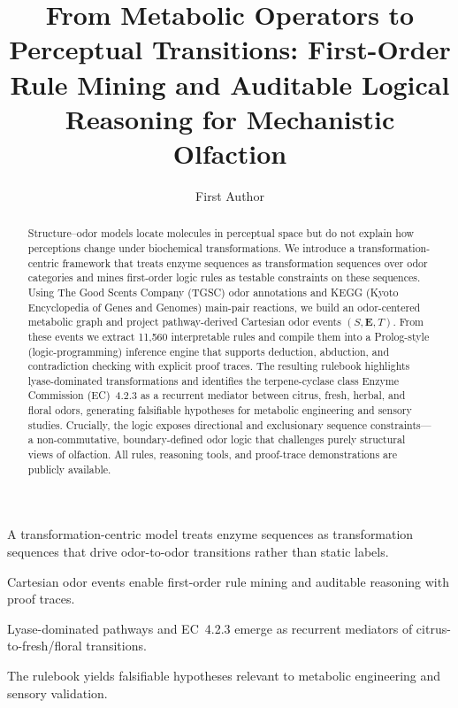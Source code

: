 \documentclass[a4paper,fleqn]{cas-sc}
\begin{document}
\let\WriteBookmarks\relax



\title[mode=title]{From Metabolic Operators to Perceptual Transitions: First-Order Rule Mining and Auditable Logical Reasoning for Mechanistic Olfaction}

\author[1]{First Author}
\cormark[1]



\begin{abstract}
Structure--odor models locate molecules in perceptual space but do not explain how perceptions change under biochemical transformations. We introduce a transformation-centric framework that treats enzyme sequences as transformation sequences over odor categories and mines first-order logic rules as testable constraints on these sequences. Using The Good Scents Company (TGSC) odor annotations and KEGG (Kyoto Encyclopedia of Genes and Genomes) main-pair reactions, we build an odor-centered metabolic graph and project pathway-derived Cartesian odor events $(S, \mathbf{E}, T)$. From these events we extract 11,560 interpretable rules and compile them into a Prolog-style (logic-programming) inference engine that supports deduction, abduction, and contradiction checking with explicit proof traces. The resulting rulebook highlights lyase-dominated transformations and identifies the terpene-cyclase class Enzyme Commission (EC)~4.2.3 as a recurrent mediator between citrus, fresh, herbal, and floral odors, generating falsifiable hypotheses for metabolic engineering and sensory studies. Crucially, the logic exposes directional and exclusionary sequence constraints---a non-commutative, boundary-defined odor logic that challenges purely structural views of olfaction. All rules, reasoning tools, and proof-trace demonstrations are publicly available.
\end{abstract}

\begin{highlights}
\item A transformation-centric model treats enzyme sequences as transformation sequences that drive odor-to-odor transitions rather than static labels.
\item Cartesian odor events enable first-order rule mining and auditable reasoning with proof traces.
\item Lyase-dominated pathways and EC~4.2.3 emerge as recurrent mediators of citrus-to-fresh/floral transitions.
\item The rulebook yields falsifiable hypotheses relevant to metabolic engineering and sensory validation.
\end{highlights}
\end{document}
